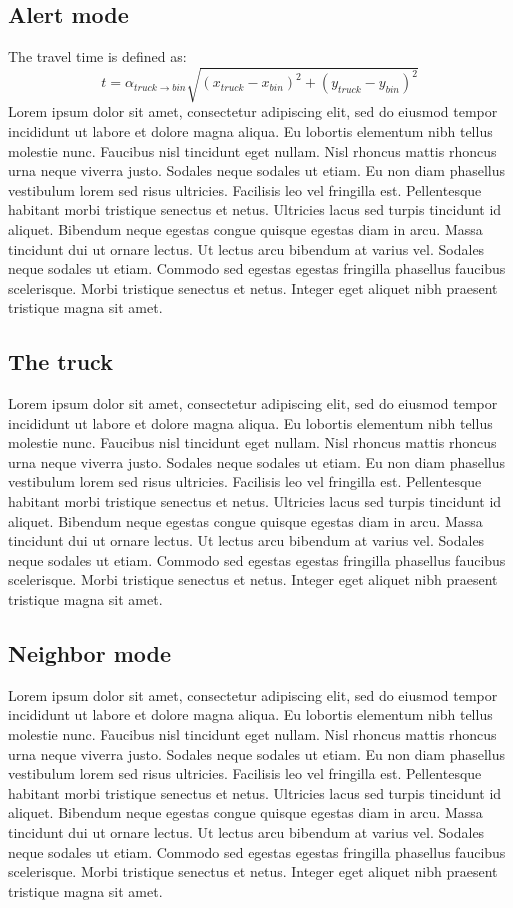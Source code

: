 \documentclass[]{article}
\begin{document}
\subsection{Alert mode}
The travel time is defined as:
$$t = \alpha_{truck\rightarrow bin}\sqrt{\displaystyle(x_{truck} - x_{bin})^2 + (y_{truck} - y_{bin})^2}$$
Lorem ipsum dolor sit amet, consectetur adipiscing elit, sed do eiusmod tempor incididunt ut labore et dolore magna aliqua. Eu lobortis elementum nibh tellus molestie nunc. Faucibus nisl tincidunt eget nullam. Nisl rhoncus mattis rhoncus urna neque viverra justo. Sodales neque sodales ut etiam. Eu non diam phasellus vestibulum lorem sed risus ultricies. Facilisis leo vel fringilla est. Pellentesque habitant morbi tristique senectus et netus. Ultricies lacus sed turpis tincidunt id aliquet. Bibendum neque egestas congue quisque egestas diam in arcu. Massa tincidunt dui ut ornare lectus. Ut lectus arcu bibendum at varius vel. Sodales neque sodales ut etiam. Commodo sed egestas egestas fringilla phasellus faucibus scelerisque. Morbi tristique senectus et netus. Integer eget aliquet nibh praesent tristique magna sit amet.
\subsection{The truck}
Lorem ipsum dolor sit amet, consectetur adipiscing elit, sed do eiusmod tempor incididunt ut labore et dolore magna aliqua. Eu lobortis elementum nibh tellus molestie nunc. Faucibus nisl tincidunt eget nullam. Nisl rhoncus mattis rhoncus urna neque viverra justo. Sodales neque sodales ut etiam. Eu non diam phasellus vestibulum lorem sed risus ultricies. Facilisis leo vel fringilla est. Pellentesque habitant morbi tristique senectus et netus. Ultricies lacus sed turpis tincidunt id aliquet. Bibendum neque egestas congue quisque egestas diam in arcu. Massa tincidunt dui ut ornare lectus. Ut lectus arcu bibendum at varius vel. Sodales neque sodales ut etiam. Commodo sed egestas egestas fringilla phasellus faucibus scelerisque. Morbi tristique senectus et netus. Integer eget aliquet nibh praesent tristique magna sit amet.
\subsection{Neighbor mode}
Lorem ipsum dolor sit amet, consectetur adipiscing elit, sed do eiusmod tempor incididunt ut labore et dolore magna aliqua. Eu lobortis elementum nibh tellus molestie nunc. Faucibus nisl tincidunt eget nullam. Nisl rhoncus mattis rhoncus urna neque viverra justo. Sodales neque sodales ut etiam. Eu non diam phasellus vestibulum lorem sed risus ultricies. Facilisis leo vel fringilla est. Pellentesque habitant morbi tristique senectus et netus. Ultricies lacus sed turpis tincidunt id aliquet. Bibendum neque egestas congue quisque egestas diam in arcu. Massa tincidunt dui ut ornare lectus. Ut lectus arcu bibendum at varius vel. Sodales neque sodales ut etiam. Commodo sed egestas egestas fringilla phasellus faucibus scelerisque. Morbi tristique senectus et netus. Integer eget aliquet nibh praesent tristique magna sit amet.
\end{document}
